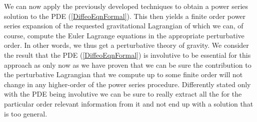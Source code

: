 We can now apply the previously developed techniques to obtain a power series solution to the PDE (\ref{DiffeoEqnFormal}). This then yields a finite order power series expansion of the requested gravitational Lagrangian of which we can, of course, compute the Euler Lagrange equations in the appropriate perturbative order. In other words, we thus get a perturbative theory of gravity. We consider the result that the PDE (\ref{DiffeoEqnFormal}) is involutive to be essential for this approach as only now as we have proven that we can be sure the contribution to the perturbative Lagrangian that we compute up to some finite order will not change in any higher-order of the power series procedure. Differently stated only with the PDE being involutive we can be sure to really extract all the for the particular order relevant information from it and not end up with a solution that is too general. 

